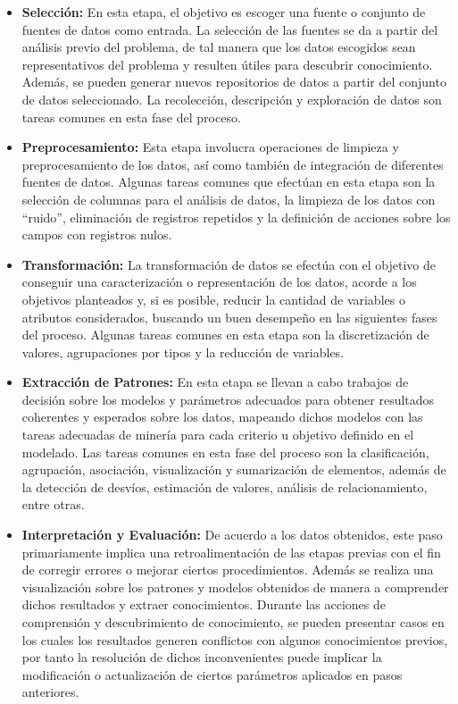 \begin{itemize}

\item \textbf{Selecci\'on:} En esta etapa, el objetivo es escoger una fuente o conjunto de fuentes de datos como entrada. La selecci\'on de las fuentes se da a partir del an\'alisis previo del problema, de tal manera que los datos escogidos sean representativos del problema y resulten \'utiles para descubrir conocimiento. Adem\'as, se pueden generar nuevos repositorios de datos a partir del conjunto de datos seleccionado. La recolecci\'on, descripci\'on y exploraci\'on de datos son tareas comunes en esta fase del proceso.
\item \textbf{Preprocesamiento:} Esta etapa involucra operaciones de limpieza y preprocesamiento de los datos, as\'i como tambi\'en de integraci\'on de diferentes fuentes de datos. Algunas tareas comunes que efect\'uan en esta etapa son la selecci\'on de columnas para el an\'alisis de datos, la limpieza de los datos con ``ruido'', eliminaci\'on de registros repetidos y la definici\'on de acciones sobre los campos con registros nulos.
\item \textbf{Transformaci\'on:} La transformaci\'on de datos se efect\'ua con el objetivo de conseguir una caracterizaci\'on o representaci\'on de los datos, acorde a los objetivos planteados y, si es posible, reducir la cantidad de variables o atributos considerados, buscando un buen desempe\~no en las siguientes fases del proceso. Algunas tareas comunes en esta etapa son la discretizaci\'on de valores, agrupaciones por tipos y la reducci\'on de variables.
\item \textbf{Extracci\'on de Patrones:} En esta etapa se llevan a cabo trabajos de decisi\'on sobre los modelos y par\'ametros adecuados para obtener resultados coherentes y esperados sobre los datos, mapeando dichos modelos con las tareas adecuadas de miner\'ia para cada criterio u objetivo definido en el modelado. Las tareas comunes en esta fase del proceso son la clasificaci\'on, agrupaci\'on, asociaci\'on, visualizaci\'on y sumarizaci\'on de elementos, adem\'as de la detecci\'on de desv\'ios, estimaci\'on de valores, an\'alisis de relacionamiento, entre otras.
\item \textbf{Interpretaci\'on y Evaluaci\'on:} De acuerdo a los datos obtenidos, este paso primariamente implica una retroalimentaci\'on de las etapas previas con el fin de corregir errores o mejorar ciertos procedimientos. Adem\'as se realiza una visualizaci\'on sobre los patrones y modelos obtenidos de manera a comprender dichos resultados y extraer conocimientos. Durante las acciones de comprensi\'on y descubrimiento de conocimiento, se pueden presentar casos en los cuales los resultados generen conflictos con algunos conocimientos previos, por tanto la resoluci\'on de dichos inconvenientes puede implicar la modificaci\'on o actualizaci\'on de ciertos par\'ametros aplicados en pasos anteriores.

\end{itemize}


